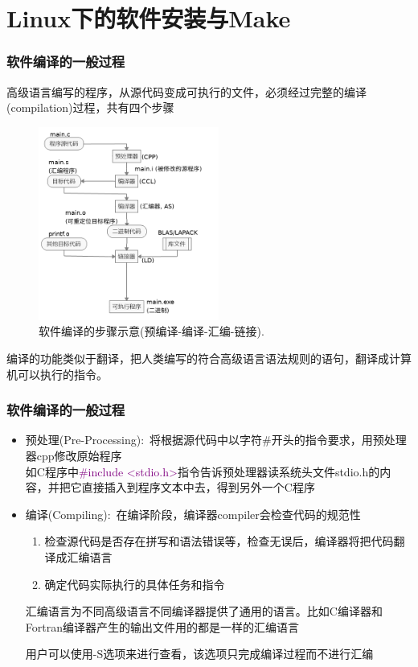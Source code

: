 \section{\rm{Linux}下的软件安装与\rm{Make}}
\frame
{
	\frametitle{软件编译的一般过程}
高级语言编写的程序，从源代码变成可执行的文件，必须经过完整的编译(\textrm{compilation})过程，共有四个步骤
\begin{figure}[h!]
	\vskip -8pt
\centering
\includegraphics[height=2.5in,viewport=0 0 500 600,clip]{Figures/compiler_procedure.png}
\caption{\small \textrm{软件编译的步骤示意(预编译-编译-汇编-链接).}}%
\label{Fig:Compiler}
\end{figure}
编译的功能类似于翻译，把人类编写的符合高级语言语法规则的语句，翻译成计算机可以执行的指令。
}

\frame
{
	\frametitle{软件编译的一般过程}
\begin{itemize}
	\item 预处理\textrm{(Pre-Processing)}:~将根据源代码中以字符\#开头的指令要求，用预处理器\textrm{cpp}修改原始程序\\
		如\textrm{C}程序中\textcolor{purple}{\textrm{\#include <stdio.h>}}指令告诉预处理器读系统头文件\textrm{stdio.h}的内容，并把它直接插入到程序文本中去，得到另外一个\textrm{C}程序%
	\item 编译\textrm{(Compiling)}:~在编译阶段，编译器\textrm{compiler}会检查代码的规范性
		\begin{enumerate}
			\item 检查源代码是否存在拼写和语法错误等，检查无误后，编译器将把代码翻译成汇编语言
			\item 确定代码实际执行的具体任务和指令
		\end{enumerate}
		汇编语言为不同高级语言不同编译器提供了通用的语言。比如\textrm{C}编译器和\textrm{Fortran}编译器产生的输出文件用的都是一样的汇编语言

		用户可以使用\textrm{-S}选项来进行查看，该选项只完成编译过程而不进行汇编
\end{itemize}
}

